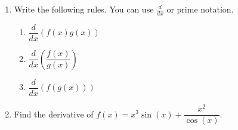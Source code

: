 \documentclass[12pt]{article}
\begin{document}
 
\begin{enumerate}
    \item Write the following rules. You can use $\frac{d}{dx}$ or prime notation.
    \begin{enumerate}
        \item $\dfrac{d}{dx}\left(f(x)g(x)\right)$
        \vfill
        \item $\dfrac{d}{dx}\left(\dfrac{f(x)}{g(x)}\right)$
        \vfill
        \item $\dfrac{d}{dx}\left(f(g(x))\right)$
        \vfill
    \end{enumerate}
    \item Find the derivative of $f(x) = x^3\sin(x) + \dfrac{x^2}{\cos(x)}$.
    \vspace{4in}
\end{enumerate}
\end{document}
